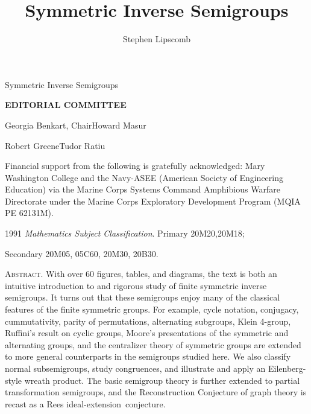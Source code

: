 \documentclass{surv-l}
\numberwithin{equation}{section}
\numberwithin{table}{section}
\numberwithin{figure}{section}
\theoremstyle{definition}
\newenvironment{copyrightpage}{\clearpage\thispagestyle{empty}}{\thispagestyle{empty}\clearpage}
\begin{document}
\frontmatter

\begin{titlepage}
Symmetric Inverse Semigroups
\end{titlepage}

\title{Symmetric Inverse Semigroups}

\author{Stephen Lipscomb}



\maketitle

\begin{copyrightpage}
\begin{center}
\textbf{EDITORIAL COMMITTEE}
\end{center}

\noindent\qquad\qquad\qquad Georgia Benkart, Chair\qquad\qquad\qquad Howard Masur

\noindent\qquad\qquad\qquad Robert Greene\qquad\qquad\qquad\qquad\qquad Tudor Ratiu

Financial support from the following is gratefully acknowledged:
Mary Washington College and the Navy-ASEE (American Society of
Engineering Education) via the Marine Corps Systems Command
Amphibious Warfare Directorate under the Marine Corps Exploratory
Development Program (MQIA PE 62131M).

\begin{center}
1991 \emph{Mathematics Subject Classification}. Primary 20M20,20M18;

Secondary 20M05, 05C60, 20M30, 20B30.
\end{center}

\noindent \textsc{Abstract}. With over 60 figures, tables, and
diagrams, the text is both an intuitive introduction to and
rigorous study of finite symmetric inverse semigroups. It turns
out that these semigroups enjoy many of the classical features of
the finite symmetric groups. For example, cycle notation,
conjugacy, cummutativity, parity of permutations, alternating
subgroups, Klein 4-group, Ruffini's result
on cyclic groups, Moore's presentations of the symmetric and
alternating groups, and the centralizer theory of symmetric groups
are extended to more general counterparts in the semigroups
studied here. We also classify normal subsemigroups, study
congruences, and illustrate and apply an Eilenberg-style wreath
product. The basic semigroup theory is further extended to partial
transformation semigroups, and the Reconstruction
Conjecture of graph theory is
recast as a Rees ideal-extension~conjecture.\\


\end{copyrightpage}
\end{document}
